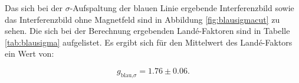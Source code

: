 Das sich bei der $\sigma$-Aufspaltung der blauen Linie ergebende Interferenzbild
sowie das Interferenzbild ohne Magnetfeld sind in Abbildung \ref{fig:blausigmacut}
zu sehen. Die sich bei der Berechnung ergebenden Landé-Faktoren sind in Tabelle
\ref{tab:blausigma} aufgelistet.
Es ergibt sich für den Mittelwert des Landé-Faktors ein Wert von:

\begin{equation}
  \label{eq:lande_blau_sigma}
  g_\text{blau,$\sigma$} = 1.76\pm0.06.
\end{equation}

